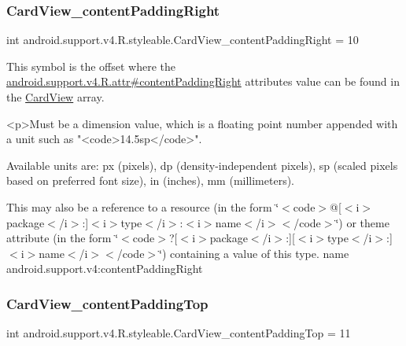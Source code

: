 \subsubsection{\texorpdfstring{Card\+View\+\_\+content\+Padding\+Right}{CardView\_contentPaddingRight}}
{\footnotesize\ttfamily int android.\+support.\+v4.\+R.\+styleable.\+Card\+View\+\_\+content\+Padding\+Right = 10\hspace{0.3cm}{\ttfamily [static]}}

This symbol is the offset where the \hyperlink{classandroid_1_1support_1_1v4_1_1R_1_1attr_af6d3428e88c6646dba8ee41c07f71d8c}{android.\+support.\+v4.\+R.\+attr\#content\+Padding\+Right} attribute\textquotesingle{}s value can be found in the \hyperlink{classandroid_1_1support_1_1v4_1_1R_1_1styleable_a0e520cd4c78beb0d456e4018c4ba0e86}{Card\+View} array.

\begin{DoxyVerb}      <p>Must be a dimension value, which is a floating point number appended with a unit such as "<code>14.5sp</code>".
\end{DoxyVerb}
 Available units are\+: px (pixels), dp (density-\/independent pixels), sp (scaled pixels based on preferred font size), in (inches), mm (millimeters). 

This may also be a reference to a resource (in the form \char`\"{}$<$code$>$@\mbox{[}$<$i$>$package$<$/i$>$\+:\mbox{]}$<$i$>$type$<$/i$>$\+:$<$i$>$name$<$/i$>$$<$/code$>$\char`\"{}) or theme attribute (in the form \char`\"{}$<$code$>$?\mbox{[}$<$i$>$package$<$/i$>$\+:\mbox{]}\mbox{[}$<$i$>$type$<$/i$>$\+:\mbox{]}$<$i$>$name$<$/i$>$$<$/code$>$\char`\"{}) containing a value of this type.  name android.\+support.\+v4\+:content\+Padding\+Right \mbox{\label{classandroid_1_1support_1_1v4_1_1R_1_1styleable_a3fba8ccb4f7b564c68196944c1b7f422}} 
\subsubsection{\texorpdfstring{Card\+View\+\_\+content\+Padding\+Top}{CardView\_contentPaddingTop}}
{\footnotesize\ttfamily int android.\+support.\+v4.\+R.\+styleable.\+Card\+View\+\_\+content\+Padding\+Top = 11\hspace{0.3cm}{\ttfamily [static]}}


